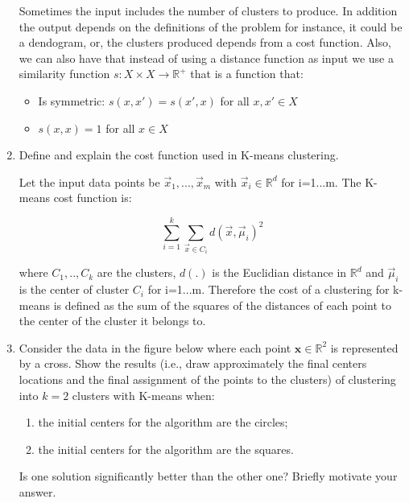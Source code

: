 \documentclass[a4paper,11pt,oneside]{book}
\begin{document}
\begin{enumerate}
\begin{solution}
    Sometimes the input includes the number of clusters to produce. In addition the output depends on the definitions of the problem for instance, it could be a dendogram, or, the clusters produced depends from a cost function. Also, we can also have that instead of using a distance function as input we use a similarity function $s : X \times X \to \mathbb{R}^+$ that is a function that:
    
    \begin{itemize}
    \item Is symmetric: $s(x,x') = s(x',x)$ for all $x,x' \in X$
    \item $s(x,x) = 1$ for all $x \in X$
    \end{itemize}
\end{solution}

\clearpage
\item Define and explain the cost function used in K-means clustering.
\begin{solution}
    Let the input data points be $\vec{x}_1, ..., \vec{x}_m$ with $\vec{x}_i \in \mathbb{R}^d$ for i=1...m. The K-means cost function is:
    
    $$\sum_{i=1}^k \sum_{\vec{x}\in C_i} d(\vec{x},\vec{\mu}_i)^2$$
    
    where $C_1,..,C_k$ are the clusters, $d(.)$ is the Euclidian distance in $\mathbb{R}^d$ and $\vec{\mu}_i$ is the center of cluster $C_i$ for i=1...m. Therefore the cost of a clustering for k-means is defined as the sum of the squares of the distances of each point to the center of the cluster it belongs to.
\end{solution}

\item Consider the data in the figure below where each point $\mathbf{x} \in \mathbb{R}^2$ is represented by a cross. Show the results (i.e., draw approximately the final centers locations and the final assignment of the points to the clusters) of clustering into $k = 2$ clusters with K-means when:
    \begin{enumerate}
    \item the initial centers for the algorithm are the circles;
    \item the initial centers for the algorithm are the squares.
    \end{enumerate}
    Is one solution significantly better than the other one? Briefly motivate your answer.


\end{enumerate}
\end{document}
